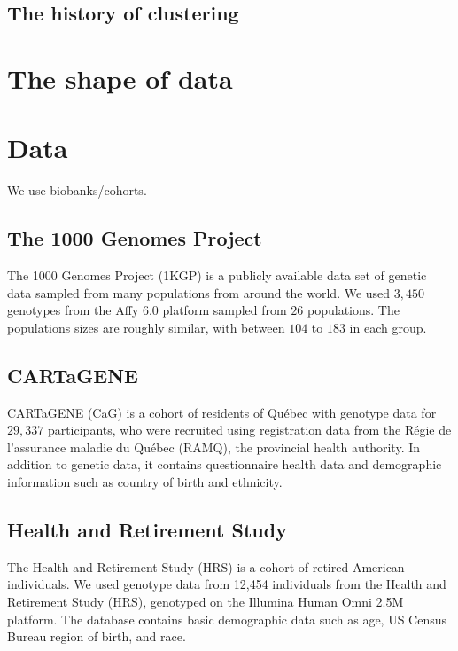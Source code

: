 \subsection{The history of clustering}

\section{The shape of data}

\section{Data}
We use biobanks/cohorts.

\subsection{The 1000 Genomes Project}

The 1000 Genomes Project (1KGP) is a publicly available data set of genetic data sampled from many populations from around the world\citep{global_2015}. We used $3,450$ genotypes from the Affy 6.0 platform sampled from $26$  populations. The populations sizes are roughly similar, with between $104$ to $183$ in each group.

\subsection{CARTaGENE}

CARTaGENE (CaG) is a cohort of residents of Qu\'{e}bec with genotype data for $29,337$ participants, who were recruited using registration data from the R\'{e}gie de l’assurance maladie du Qu\'{e}bec (RAMQ), the provincial health authority\citep{awadalla_cohort_2013}. In addition to genetic data, it contains questionnaire health data and demographic information such as country of birth and ethnicity.

\subsection{Health and Retirement Study}

The Health and Retirement Study (HRS) is a cohort of retired American individuals\citep{juster_overview_1995}. We used genotype data from 12,454 individuals from the Health and Retirement Study (HRS), genotyped on the Illumina Human Omni 2.5M platform. The database contains basic demographic data such as age, US Census Bureau region of birth, and race.

